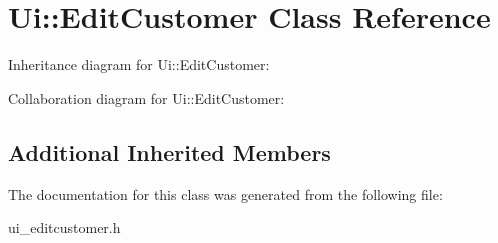 \section{Ui\+:\+:Edit\+Customer Class Reference}
\label{class_ui_1_1_edit_customer}


Inheritance diagram for Ui\+:\+:Edit\+Customer\+:


Collaboration diagram for Ui\+:\+:Edit\+Customer\+:
\subsection*{Additional Inherited Members}


The documentation for this class was generated from the following file\+:\begin{DoxyCompactItemize}
\item 
ui\+\_\+editcustomer.\+h\end{DoxyCompactItemize}
